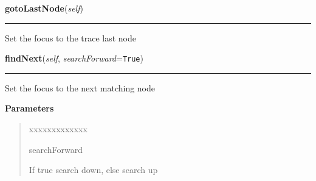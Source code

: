     \label{tracetool:WinTrace:gotoLastNode}

    \vspace{0.5ex}

\hspace{.8\funcindent}\begin{boxedminipage}{\funcwidth}

    \raggedright \textbf{gotoLastNode}(\textit{self})

    \vspace{-1.5ex}

    \rule{\textwidth}{0.5\fboxrule}
\setlength{\parskip}{2ex}
    Set the focus to the trace last node

\setlength{\parskip}{1ex}
    \end{boxedminipage}

    \label{tracetool:WinTrace:findNext}

    \vspace{0.5ex}

\hspace{.8\funcindent}\begin{boxedminipage}{\funcwidth}

    \raggedright \textbf{findNext}(\textit{self}, \textit{searchForward}={\tt True})

    \vspace{-1.5ex}

    \rule{\textwidth}{0.5\fboxrule}
\setlength{\parskip}{2ex}
    Set the focus to the next matching node

\setlength{\parskip}{1ex}
      \textbf{Parameters}
      \vspace{-1ex}

      \begin{quote}
        \begin{Ventry}{xxxxxxxxxxxxx}

          \item[searchForward]

          If true search down, else search up

        \end{Ventry}

      \end{quote}

    \end{boxedminipage}

